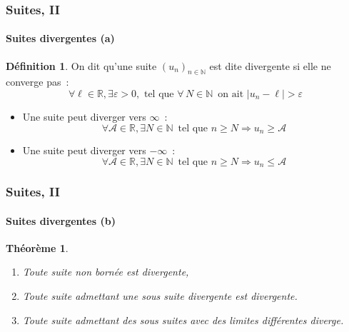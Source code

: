 \documentclass[10pt,notheorems]{beamer}
\theoremstyle{plain}
\newtheorem{theorem}{Théorème}
\theoremstyle{definition} %
\newtheorem{definition}{Définition}
\begin{document}
\begin{frame}
  \frametitle{Suites, II}
  \framesubtitle{Suites divergentes (a)}
  \hypertarget{slide_suite_divergente_1}{}

  \bigskip

  \begin{definition}
    On dit qu'une suite $(u_n)_{n\in\mathbb N}$ est dite divergente si elle ne converge pas~:
    \[
      \forall \ell\in\mathbb R, \exists\varepsilon>0, \text{ tel que } \forall\, N\in\mathbb N\, \text{ on ait }  |u_n-\ell|>\varepsilon
    \]
  \end{definition}

  \bigskip

  \begin{itemize}

  \item Une suite peut diverger vers $\infty$~:
    \[
      \forall \mathcal A \in\mathbb R, \exists N\in\mathbb N\, \text{ tel que } n\geq N \Rightarrow u_n\geq \mathcal A
    \]

  \item Une suite peut diverger vers $-\infty$~:
    \[
      \forall \mathcal A \in\mathbb R, \exists N\in\mathbb N\, \text{ tel que } n\geq N \Rightarrow u_n\leq \mathcal A
    \]

  \end{itemize}

\end{frame}


\begin{frame}
  \frametitle{Suites, II}
  \framesubtitle{Suites divergentes (b)}
  \hypertarget{slide_suite_divergente_2}{}

  \bigskip

  \begin{theorem}

    \begin{enumerate}

    \item Toute suite non bornée est divergente,\newline

    \item Toute suite admettant une sous suite divergente est divergente.\newline

    \item Toute suite admettant des sous suites avec des limites différentes diverge.\newline

    \end{enumerate}

  \end{theorem}

\end{frame}
\end{document}
